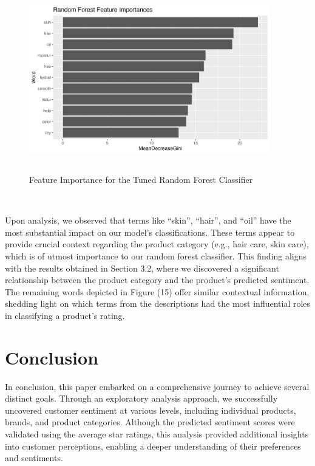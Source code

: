 \documentclass[10pt]{article}
\begin{document}
\begin{figure}[ht!]
    \centering
    \hspace*{-2em}
    \includegraphics[height=80mm, width=105mm]{desc_feat_imp.png}
    \caption{Feature Importance for the Tuned Random Forest Classifier}
\end{figure}


\

Upon analysis, we observed that terms like ``skin'', ``hair'', and ``oil'' have the most substantial impact on our model's classifications. These terms appear to provide crucial context regarding the product category (e.g., hair care, skin care), which is of utmost importance to our random forest classifier. This finding aligns with the results obtained in Section 3.2, where we discovered a significant relationship between the product category and the product's predicted sentiment. The remaining words depicted in Figure (15) offer similar contextual information, shedding light on which terms from the descriptions had the most influential roles in classifying a product's rating.


\section{Conclusion}

In conclusion, this paper embarked on a comprehensive journey to achieve several distinct goals. Through an exploratory analysis approach, we successfully uncovered customer sentiment at various levels, including individual products, brands, and product categories. Although the predicted sentiment scores were validated using the average star ratings, this analysis provided additional insights into customer perceptions, enabling a deeper understanding of their preferences and sentiments.
\end{document}
